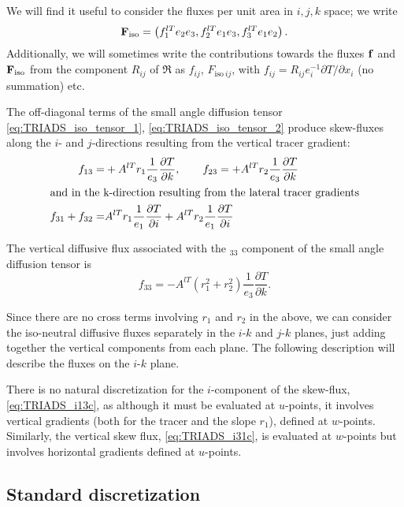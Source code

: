 \documentclass[../main/NEMO_manual]{subfiles}
\begin{document}
We will find it useful to consider the fluxes per unit area in $i,j,k$ space; we write
\[
   \mathbf{F} _{\mathrm{iso}}=\left(f_1^{lT}e_2e_3, f_2^{lT}e_1e_3, f_3^{lT}e_1e_2\right).
\]
Additionally, we will sometimes write the contributions towards the fluxes $ \mathbf{f} $ and
$ \mathbf{F} _{\mathrm{iso}}$ from the component $R_{ij}$ of $\Re$ as $f_{ij}$, $F_{\mathrm{iso}\: ij}$,
with $f_{ij}=R_{ij}e_i^{-1}\partial T/\partial x_i$ (no summation) etc.

The off-diagonal terms of the small angle diffusion tensor
\autoref{eq:TRIADS_iso_tensor_1}, \autoref{eq:TRIADS_iso_tensor_2} produce skew-fluxes along
the $i$- and $j$-directions resulting from the vertical tracer gradient:
\begin{align}
  \label{eq:TRIADS_i13c}
  f_{13}=&+{A^{lT}} r_1\frac{1}{e_3}\frac{\partial T}{\partial k},\qquad f_{23}=+{A^{lT}} r_2\frac{1}{e_3}\frac{\partial T}{\partial k}\\
  \intertext{and in the k-direction resulting from the lateral tracer gradients}
  \label{eq:TRIADS_i31c}
  f_{31}+f_{32}=& {A^{lT}} r_1\frac{1}{e_1}\frac{\partial T}{\partial i}+{A^{lT}} r_2\frac{1}{e_1}\frac{\partial T}{\partial i}
\end{align}

The vertical diffusive flux associated with the $_{33}$ component of the small angle diffusion tensor is
\begin{equation}
  \label{eq:TRIADS_i33c}
  f_{33}=-{A^{lT}}(r_1^2 +r_2^2) \frac{1}{e_3}\frac{\partial T}{\partial k}.
\end{equation}

Since there are no cross terms involving $r_1$ and $r_2$ in the above,
we can consider the iso-neutral diffusive fluxes separately in the $i$-$k$ and $j$-$k$ planes,
just adding together the vertical components from each plane.
The following description will describe the fluxes on the $i$-$k$ plane.

There is no natural discretization for the $i$-component of the skew-flux, \autoref{eq:TRIADS_i13c},
as although it must be evaluated at $u$-points,
it involves vertical gradients (both for the tracer and the slope $r_1$), defined at $w$-points.
Similarly, the vertical skew flux, \autoref{eq:TRIADS_i31c},
is evaluated at $w$-points but involves horizontal gradients defined at $u$-points.

\subsection{Standard discretization}
\end{document}
